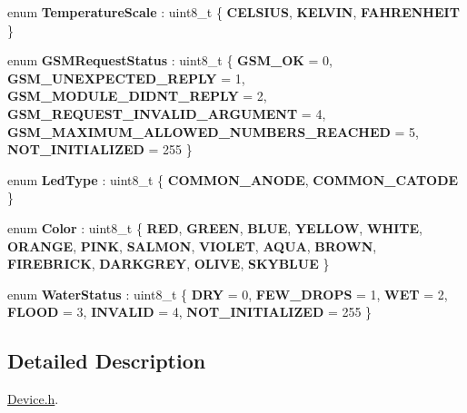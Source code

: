 \begin{DoxyCompactItemize}
\item 
\mbox{\label{namespace_easyuino_a85413be05b0d8b00c7f4ba6a364831f0}} 
enum {\bfseries Temperature\+Scale} \+: uint8\+\_\+t \{ {\bfseries C\+E\+L\+S\+I\+US}, 
{\bfseries K\+E\+L\+V\+IN}, 
{\bfseries F\+A\+H\+R\+E\+N\+H\+E\+IT}
 \}
\item 
\mbox{\label{namespace_easyuino_a5e4e15cd0975a7cd647ebcc96c690483}} 
enum {\bfseries G\+S\+M\+Request\+Status} \+: uint8\+\_\+t \{ \newline
{\bfseries G\+S\+M\+\_\+\+OK} = 0, 
{\bfseries G\+S\+M\+\_\+\+U\+N\+E\+X\+P\+E\+C\+T\+E\+D\+\_\+\+R\+E\+P\+LY} = 1, 
{\bfseries G\+S\+M\+\_\+\+M\+O\+D\+U\+L\+E\+\_\+\+D\+I\+D\+N\+T\+\_\+\+R\+E\+P\+LY} = 2, 
{\bfseries G\+S\+M\+\_\+\+R\+E\+Q\+U\+E\+S\+T\+\_\+\+I\+N\+V\+A\+L\+I\+D\+\_\+\+A\+R\+G\+U\+M\+E\+NT} = 4, 
\newline
{\bfseries G\+S\+M\+\_\+\+M\+A\+X\+I\+M\+U\+M\+\_\+\+A\+L\+L\+O\+W\+E\+D\+\_\+\+N\+U\+M\+B\+E\+R\+S\+\_\+\+R\+E\+A\+C\+H\+ED} = 5, 
{\bfseries N\+O\+T\+\_\+\+I\+N\+I\+T\+I\+A\+L\+I\+Z\+ED} = 255
 \}
\item 
\mbox{\label{namespace_easyuino_a74bc07d98caedb13e9712514799659fa}} 
enum {\bfseries Led\+Type} \+: uint8\+\_\+t \{ {\bfseries C\+O\+M\+M\+O\+N\+\_\+\+A\+N\+O\+DE}, 
{\bfseries C\+O\+M\+M\+O\+N\+\_\+\+C\+A\+T\+O\+DE}
 \}
\item 
\mbox{\label{namespace_easyuino_a1dfcdd2c7e87c01db504814ec8b3579c}} 
enum {\bfseries Color} \+: uint8\+\_\+t \{ \newline
{\bfseries R\+ED}, 
{\bfseries G\+R\+E\+EN}, 
{\bfseries B\+L\+UE}, 
{\bfseries Y\+E\+L\+L\+OW}, 
\newline
{\bfseries W\+H\+I\+TE}, 
{\bfseries O\+R\+A\+N\+GE}, 
{\bfseries P\+I\+NK}, 
{\bfseries S\+A\+L\+M\+ON}, 
\newline
{\bfseries V\+I\+O\+L\+ET}, 
{\bfseries A\+Q\+UA}, 
{\bfseries B\+R\+O\+WN}, 
{\bfseries F\+I\+R\+E\+B\+R\+I\+CK}, 
\newline
{\bfseries D\+A\+R\+K\+G\+R\+EY}, 
{\bfseries O\+L\+I\+VE}, 
{\bfseries S\+K\+Y\+B\+L\+UE}
 \}
\item 
\mbox{\label{namespace_easyuino_a79c73f0814a2f298bdae8029bb04f44d}} 
enum {\bfseries Water\+Status} \+: uint8\+\_\+t \{ \newline
{\bfseries D\+RY} = 0, 
{\bfseries F\+E\+W\+\_\+\+D\+R\+O\+PS} = 1, 
{\bfseries W\+ET} = 2, 
{\bfseries F\+L\+O\+OD} = 3, 
\newline
{\bfseries I\+N\+V\+A\+L\+ID} = 4, 
{\bfseries N\+O\+T\+\_\+\+I\+N\+I\+T\+I\+A\+L\+I\+Z\+ED} = 255
 \}
\end{DoxyCompactItemize}


\subsection{Detailed Description}
\hyperlink{_device_8h_source}{Device.\+h}. 